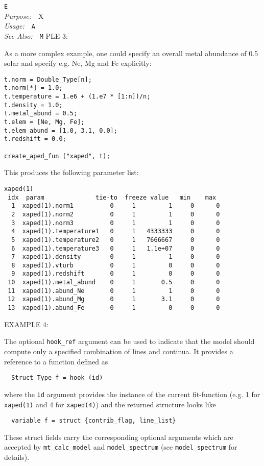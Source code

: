 \documentclass{book}
\makeatletter
\newif\ifpdf
\newenvironment{isisfunction}[4]%
{\index{{#1}@{\tt #1}}%
  \ifpdf
  \else
     \addcontentsline{toc}{subsection}{{#1} -- {#2}}
  \fi
  \vbox{
          \vspace*{\baselineskip}
          {\LARGE\tt #1}\vspace*{\baselineskip}\\
          {{\it Purpose:}~~{#2}}\\
          {{\it Usage:}~~{\tt #3}}\\
          {{\it See Also:}~~{\tt #4}}
       }
}%
{ }
\makeatother
\begin{document}
\begin{isisfunction}
EXAMPLE 3:

As a more complex example, one could specify an overall metal
abundance of 0.5 solar and specify e.g. Ne, Mg and Fe explicitly:

\begin{verbatim}
t.norm = Double_Type[n];
t.norm[*] = 1.0;
t.temperature = 1.e6 + (1.e7 * [1:n])/n;
t.density = 1.0;
t.metal_abund = 0.5;
t.elem = [Ne, Mg, Fe];
t.elem_abund = [1.0, 3.1, 0.0];
t.redshift = 0.0;

create_aped_fun ("xaped", t);
\end{verbatim}

This produces the following parameter list:
\begin{verbatim}
xaped(1)
 idx  param              tie-to  freeze value   min    max
  1  xaped(1).norm1          0     1         1     0      0
  2  xaped(1).norm2          0     1         1     0      0
  3  xaped(1).norm3          0     1         1     0      0
  4  xaped(1).temperature1   0     1   4333333     0      0
  5  xaped(1).temperature2   0     1   7666667     0      0
  6  xaped(1).temperature3   0     1   1.1e+07     0      0
  7  xaped(1).density        0     1         1     0      0
  8  xaped(1).vturb          0     1         0     0      0
  9  xaped(1).redshift       0     1         0     0      0
 10  xaped(1).metal_abund    0     1       0.5     0      0
 11  xaped(1).abund_Ne       0     1         1     0      0
 12  xaped(1).abund_Mg       0     1       3.1     0      0
 13  xaped(1).abund_Fe       0     1         0     0      0
\end{verbatim}

EXAMPLE 4:

The optional \verb|hook_ref| argument can be used to
indicate that the model should compute only a specified
combination of lines and continua.  It provides
a reference to a function defined as
\begin{verbatim}
  Struct_Type f = hook (id)
\end{verbatim}
where the \verb|id| argument provides the instance of
the current fit-function (e.g. 1 for \verb|xaped(1)|
and 4 for \verb|xaped(4)|) and the returned structure looks like
\begin{verbatim}
  variable f = struct {contrib_flag, line_list}
\end{verbatim}
These struct fields carry the corresponding optional arguments
which are accepted by \verb|mt_calc_model| and
\verb|model_spectrum| (see \verb|model_spectrum| for details).


\end{isisfunction}
\end{document}
